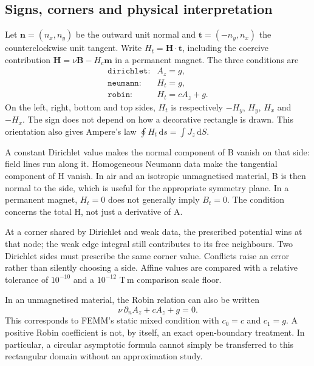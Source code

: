 \subsection{Signs, corners and physical interpretation}
Let $\mathbf n=(n_x,n_y)$ be the outward unit normal and
$\mathbf t=(-n_y,n_x)$ the counterclockwise unit tangent. Write
$H_t=\mathbf H\cdot\mathbf t$, including the coercive contribution
$\mathbf H=\nu\mathbf B-H_c\mathbf m$ in a permanent magnet.
The three conditions are
\[
 \begin{array}{ll}
 \texttt{dirichlet}:&A_z=g,\\
 \texttt{neumann}:&H_t=g,\\
 \texttt{robin}:&H_t=cA_z+g.
 \end{array}
\]
On the left, right, bottom and top sides, $H_t$ is respectively
$-H_y$, $H_y$, $H_x$ and $-H_x$. The sign does not depend on how a
decorative rectangle is drawn. This orientation also gives Ampere's law
$\oint H_t\,\mathrm ds=\int J_z\,\mathrm dS$.

A constant Dirichlet value makes the normal component of B vanish on
that side: field lines run along it. Homogeneous Neumann data make the
tangential component of H vanish. In air and an isotropic unmagnetised
material, B is then normal to the side, which is useful for the appropriate
symmetry plane. In a permanent magnet, $H_t=0$ does not generally imply
$B_t=0$. The condition concerns the total H, not just a derivative of A.

At a corner shared by Dirichlet and weak data, the prescribed potential
wins at that node; the weak edge integral still contributes to its free
neighbours. Two Dirichlet sides must prescribe the same corner value.
Conflicts raise an error rather than silently choosing a side. Affine
values are compared with a relative tolerance of $10^{-10}$ and a
$10^{-12}$ T\,m comparison scale floor.

In an unmagnetised material, the Robin relation can also be written
\[
 \nu\,\partial_n A_z+cA_z+g=0.
\]
This corresponds to FEMM's static mixed condition with $c_0=c$ and
$c_1=g$. A positive Robin coefficient is not, by itself, an exact
open-boundary treatment. In particular, a circular asymptotic formula
cannot simply be transferred to this rectangular domain without an
approximation study.

